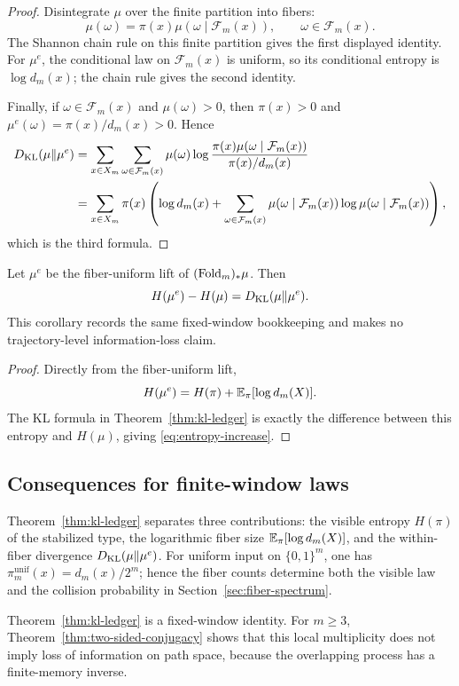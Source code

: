 \begin{proof}
Disintegrate $\mu$ over the finite partition into fibers:
\[
\mu(\omega)=\pi(x)\mu(\omega\mid\mathcal F_m(x)),
\qquad \omega\in\mathcal F_m(x).
\]
The Shannon chain rule on this finite partition gives the first displayed
identity.  For $\mu^e$, the conditional law on $\mathcal F_m(x)$ is uniform,
so its conditional entropy is $\log d_m(x)$; the chain rule gives the second
identity.

Finally, if $\omega\in\mathcal F_m(x)$ and $\mu(\omega)>0$, then
$\pi(x)>0$ and $\mu^e(\omega)=\pi(x)/d_m(x)>0$.  Hence
\[
\begin{aligned}
D_{\mathrm{KL}}(\mu\|\mu^e)
&=\sum_{x\in X_m}\sum_{\omega\in\mathcal F_m(x)}
\mu(\omega)\log
\frac{\pi(x)\mu(\omega\mid\mathcal F_m(x))}{\pi(x)/d_m(x)}\\
&=\sum_{x\in X_m}\pi(x)
\left(
\log d_m(x)+
\sum_{\omega\in\mathcal F_m(x)}
\mu(\omega\mid\mathcal F_m(x))
\log\mu(\omega\mid\mathcal F_m(x))
\right),
\end{aligned}
\]
which is the third formula.
\end{proof}

\begin{corollary}\label{cor:entropy-increase}
Let $\mu^e$ be the fiber-uniform lift of $(\mathrm{Fold}_m)_*\mu$. Then
\begin{equation}\label{eq:entropy-increase}
H(\mu^e)-H(\mu)=D_{\mathrm{KL}}(\mu\|\mu^e).
\end{equation}
This corollary records the same fixed-window bookkeeping and makes no
trajectory-level information-loss claim.
\end{corollary}

\begin{proof}
Directly from the fiber-uniform lift,
\[
H(\mu^e)=H(\pi)+\mathbb{E}_\pi[\log d_m(X)].
\]
The KL formula in Theorem~\ref{thm:kl-ledger} is exactly the difference
between this entropy and $H(\mu)$, giving \eqref{eq:entropy-increase}.
\end{proof}

\subsection{Consequences for finite-window laws}\label{sec:entropy-ledger:consequences}

\begin{remark}
Theorem~\ref{thm:kl-ledger} separates three contributions: the visible
entropy $H(\pi)$ of the stabilized type, the logarithmic fiber size
$\mathbb{E}_\pi[\log d_m(X)]$, and the within-fiber divergence
$D_{\mathrm{KL}}(\mu\|\mu^e)$. For uniform input on $\{0,1\}^m$, one has
$\pi_m^{\mathrm{unif}}(x)=d_m(x)/2^m$; hence the fiber counts determine both
the visible law and the collision probability in Section~\ref{sec:fiber-spectrum}.
\end{remark}

\begin{remark}
Theorem~\ref{thm:kl-ledger} is a fixed-window identity. For $m\ge3$, Theorem~\ref{thm:two-sided-conjugacy} shows that this local multiplicity does not imply loss of information on path space, because the overlapping process has a finite-memory inverse.
\end{remark}
